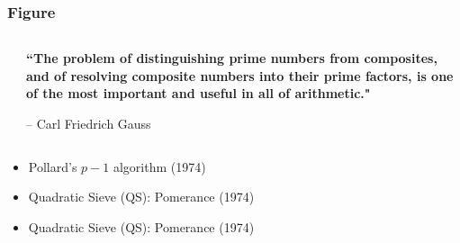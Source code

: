 \documentclass[ignorenonframetext,]{beamer}
\begin{document}
\begin{frame}
  \frametitle{Figure}
  \begin{columns}[t]
    \begin{column}{0.7\textwidth}
    \end{column}
    \begin{column}{0.3\textwidth}
      \textbf{``The problem of distinguishing prime numbers
                from composites, and of resolving composite numbers
                into their prime factors, is one of the most important and
                useful in all of arithmetic."}

      \hfill-- Carl Friedrich Gauss
    \end{column}
  \end{columns}

  \vspace*{10pt}

  \begin{itemize}
    \item Pollard's $p-1$ algorithm (1974)
    \vspace*{10pt}
    \item Quadratic Sieve (QS): Pomerance (1974)
    \vspace*{10pt}
    \item Quadratic Sieve (QS): Pomerance (1974)
  \end{itemize}
\end{frame}
\end{document}
